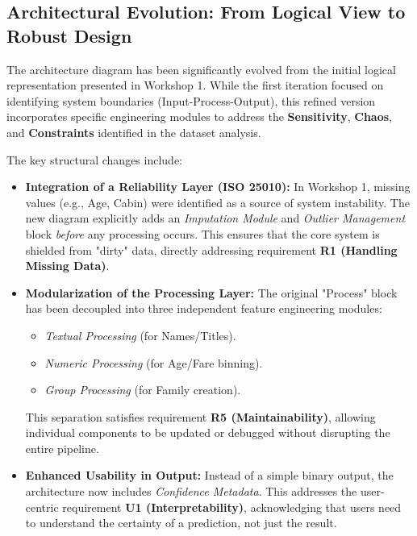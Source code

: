 \documentclass[12pt]{report}
\begin{document}
\subsection*{Architectural Evolution: From Logical View to Robust Design}

The architecture diagram has been significantly evolved from the initial logical representation presented in Workshop 1. While the first iteration focused on identifying system boundaries (Input-Process-Output), this refined version incorporates specific engineering modules to address the \textbf{Sensitivity}, \textbf{Chaos}, and \textbf{Constraints} identified in the dataset analysis.

The key structural changes include:

\begin{itemize}
    \item \textbf{Integration of a Reliability Layer (ISO 25010):} 
    In Workshop 1, missing values (e.g., Age, Cabin) were identified as a source of system instability. The new diagram explicitly adds an \textit{Imputation Module} and \textit{Outlier Management} block \textit{before} any processing occurs. This ensures that the core system is shielded from "dirty" data, directly addressing requirement \textbf{R1 (Handling Missing Data)}.

    \item \textbf{Modularization of the Processing Layer:} 
    The original "Process" block has been decoupled into three independent feature engineering modules:
    \begin{itemize}
        \item \textit{Textual Processing} (for Names/Titles).
        \item \textit{Numeric Processing} (for Age/Fare binning).
        \item \textit{Group Processing} (for Family creation).
    \end{itemize}
    This separation satisfies requirement \textbf{R5 (Maintainability)}, allowing individual components to be updated or debugged without disrupting the entire pipeline.

    \item \textbf{Enhanced Usability in Output:} 
    Instead of a simple binary output, the architecture now includes \textit{Confidence Metadata}. This addresses the user-centric requirement \textbf{U1 (Interpretability)}, acknowledging that users need to understand the certainty of a prediction, not just the result.
\end{itemize}
\end{document}
